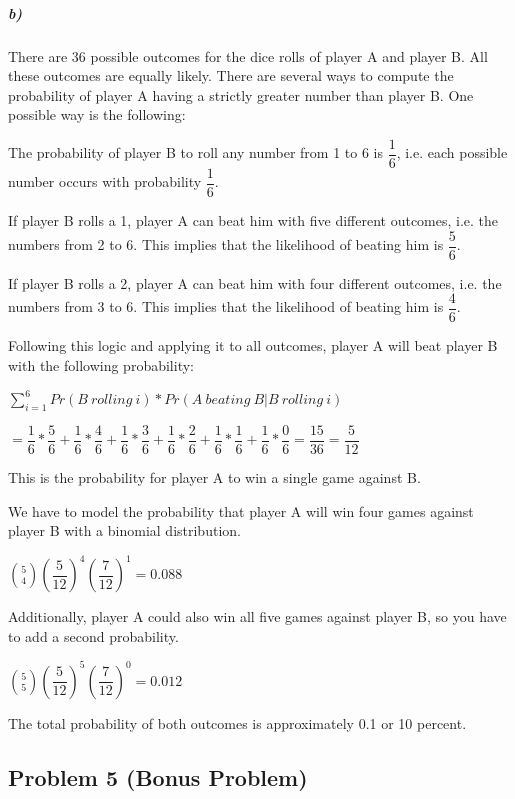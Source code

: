\documentclass[12pt,letter]{article}\usepackage[]{graphicx}\usepackage[]{color}
\begin{document}
\subparagraph{b)} There are 36 possible outcomes for the dice rolls of player A and player B. All these outcomes are equally likely. There are several ways to compute the probability of player A having a strictly greater number than player B. One possible way is the following:

The probability of player B to roll any number from 1 to 6 is $\dfrac{1}{6}$, i.e. each possible number occurs with probability $\dfrac{1}{6}$.

If player B rolls a 1, player A can beat him with five different outcomes, i.e. the numbers from 2 to 6. This implies that the likelihood of beating him is $\dfrac{5}{6}$.

If player B rolls a 2, player A can beat him with four different outcomes, i.e. the numbers from 3 to 6. This implies that the likelihood of beating him is $\dfrac{4}{6}$.

\bigskip

Following this logic and applying it to all outcomes, player A will beat player B with the following probability:

$\sum_{i=1}^{6} Pr(B\ rolling\ i) * Pr (A\ beating\ B | B\ rolling\ i)$

\bigskip

$= \dfrac{1}{6}*\dfrac{5}{6}+\dfrac{1}{6}*\dfrac{4}{6}+\dfrac{1}{6}*\dfrac{3}{6}+\dfrac{1}{6}*\dfrac{2}{6}+\dfrac{1}{6}*\dfrac{1}{6}+\dfrac{1}{6}*\dfrac{0}{6} = \dfrac{15}{36} = \dfrac{5}{12}$

This is the probability for player A to win a single game against B.

\bigskip

We have to model the probability that player A will win four games against player B with a binomial distribution.

$\binom{5}{4}(\dfrac{5}{12})^4(\dfrac{7}{12})^1 = 0.088 $

Additionally, player A could also win all five games against player B, so you have to add a second probability.

$\binom{5}{5}(\dfrac{5}{12})^5(\dfrac{7}{12})^0 = 0.012 $

\bigskip

The total probability of both outcomes is approximately 0.1 or 10 percent.



\subsection*{Problem 5 (Bonus Problem)}
\end{document}
